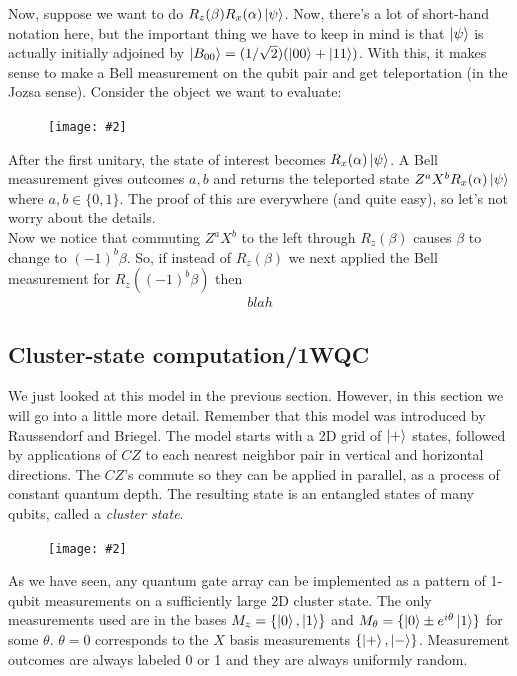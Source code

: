 \documentclass{book}
\theoremstyle{definition}
\newcommand{\al}{\alpha}
\newcommand{\be}{\beta}
\newcommand{\fig}[2]{
	\begin{figure}[!htb]
		\centering
		\texttt{[image: \#2]}
	\end{figure}}
\begin{document}
Now, suppose we want to do $R_z(\be)R_x(\al)\ket{\psi}$. Now, there's a lot of short-hand notation here, but the important thing we have to keep in mind is that $\ket{\psi}$ is actually initially adjoined by $\ket{B_{00}} = (1/\sqrt{2})(\ket{00} + \ket{11})$. With this, it makes sense to make a Bell measurement on the qubit pair and get teleportation (in the Jozsa sense). Consider the object we want to evaluate:

\fig{0.3}{bell-measure}

After the first unitary, the state of interest becomes $R_x(\al)\ket{\psi}$. A Bell measurement gives outcomes $a,b$ and returns the teleported state $Z^a X^b R_x(\al)\ket{\psi}$ where $a,b\in \{0,1\}$. The proof of this are everywhere (and quite easy), so let's not worry about the details. \\

Now we notice that commuting $Z^a X^b$ to the left through $R_z(\be)$ causes $\beta$ to change to $(-1)^b \beta$. So, if instead of $R_z(\beta)$ we next applied the Bell measurement for $R_z((-1)^b \beta)$ then 
\begin{align}
blah
\end{align}






\subsection{Cluster-state computation/1WQC}

We just looked at this model in the previous section. However, in this section we will go into a little more detail. Remember that this model was introduced by Raussendorf and Briegel. The model starts with a 2D grid of $\ket{+}$ states, followed by applications of $CZ$ to each nearest neighbor pair in vertical and horizontal directions. The $CZ$'s commute so they can be applied in parallel, as a process of constant quantum depth. The resulting state is an entangled states of many qubits, called a \textit{cluster state}.

\fig{0.3}{jozsa1}

As we have seen, any quantum gate array can be implemented as a pattern of 1-qubit measurements on a sufficiently large 2D cluster state. The only measurements used are in the bases $M_z = \{\ket{0}, \ket{1}\}$ and $M_\theta = \{ \ket{0} \pm e^{i\theta}\ket{1} \}$ for some $\theta$. $\theta = 0$ corresponds to the $X$ basis measurements $\{ \ket{+}, \ket{-}   \}$. Measurement outcomes are always labeled 0 or 1 and they are always uniformly random.  \\
\end{document}

